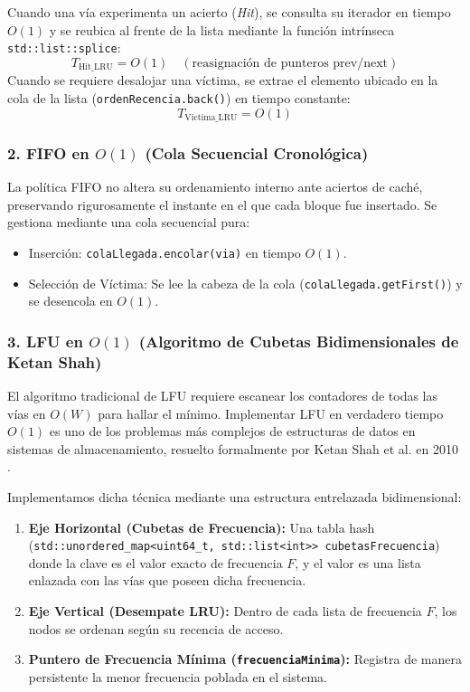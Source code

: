 \documentclass[11pt,letterpaper]{article}
\begin{document}
Cuando una vía experimenta un acierto (\textit{Hit}), se consulta su iterador en tiempo $O(1)$ y se reubica al frente de la lista mediante la función intrínseca \texttt{std::list::splice}:
\begin{equation}
    T_{\text{Hit\_LRU}} = O(1) \quad (\text{reasignación de punteros prev/next})
\end{equation}
Cuando se requiere desalojar una víctima, se extrae el elemento ubicado en la cola de la lista (\texttt{ordenRecencia.back()}) en tiempo constante:
\begin{equation}
    T_{\text{Victima\_LRU}} = O(1)
\end{equation}

\subsubsection{2. FIFO en \texorpdfstring{$O(1)$}{O(1)} (Cola Secuencial Cronológica)}
La política FIFO no altera su ordenamiento interno ante aciertos de caché, preservando rigurosamente el instante en el que cada bloque fue insertado. Se gestiona mediante una cola secuencial pura:
\begin{itemize}
    \item Inserción: \texttt{colaLlegada.encolar(via)} en tiempo $O(1)$.
    \item Selección de Víctima: Se lee la cabeza de la cola (\texttt{colaLlegada.getFirst()}) y se desencola en $O(1)$.
\end{itemize}

\subsubsection{3. LFU en \texorpdfstring{$O(1)$}{O(1)} (Algoritmo de Cubetas Bidimensionales de Ketan Shah)}
El algoritmo tradicional de LFU requiere escanear los contadores de todas las vías en $O(W)$ para hallar el mínimo. Implementar LFU en verdadero tiempo $O(1)$ es uno de los problemas más complejos de estructuras de datos en sistemas de almacenamiento, resuelto formalmente por Ketan Shah et al. en 2010 \cite{shah2010o1}.

Implementamos dicha técnica mediante una estructura entrelazada bidimensional:
\begin{enumerate}
    \item \textbf{Eje Horizontal (Cubetas de Frecuencia):} Una tabla hash (\texttt{std::unordered\_map<uint64\_t, std::list<int>> cubetasFrecuencia}) donde la clave es el valor exacto de frecuencia $F$, y el valor es una lista enlazada con las vías que poseen dicha frecuencia.
    \item \textbf{Eje Vertical (Desempate LRU):} Dentro de cada lista de frecuencia $F$, los nodos se ordenan según su recencia de acceso.
    \item \textbf{Puntero de Frecuencia Mínima (\texttt{frecuenciaMinima}):} Registra de manera persistente la menor frecuencia poblada en el sistema.
\end{enumerate}
\end{document}
